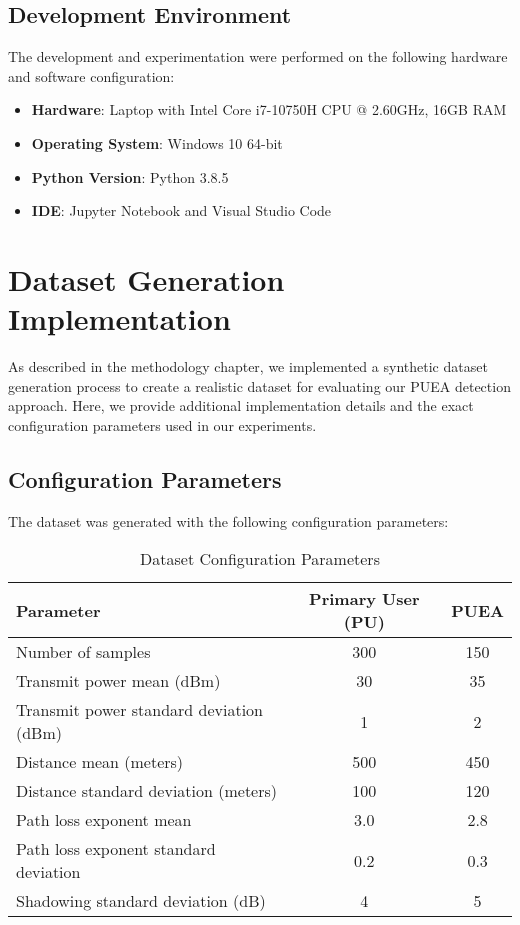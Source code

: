 \subsection{Development Environment}
The development and experimentation were performed on the following hardware and software configuration:
\begin{itemize}
    \item \textbf{Hardware}: Laptop with Intel Core i7-10750H CPU @ 2.60GHz, 16GB RAM
    \item \textbf{Operating System}: Windows 10 64-bit
    \item \textbf{Python Version}: Python 3.8.5
    \item \textbf{IDE}: Jupyter Notebook and Visual Studio Code
\end{itemize}

\section{Dataset Generation Implementation}
As described in the methodology chapter, we implemented a synthetic dataset generation process to create a realistic dataset for evaluating our PUEA detection approach. Here, we provide additional implementation details and the exact configuration parameters used in our experiments.

\subsection{Configuration Parameters}
The dataset was generated with the following configuration parameters:

\begin{table}[h]
    \centering
    \caption{Dataset Configuration Parameters}
    \label{tab:dataset_params}
    \begin{tabular}{lcc}
        \toprule
        Parameter & Primary User (PU) & PUEA \\
        \midrule
        Number of samples & 300 & 150 \\
        Transmit power mean (dBm) & 30 & 35 \\
        Transmit power standard deviation (dBm) & 1 & 2 \\
        Distance mean (meters) & 500 & 450 \\
        Distance standard deviation (meters) & 100 & 120 \\
        Path loss exponent mean & 3.0 & 2.8 \\
        Path loss exponent standard deviation & 0.2 & 0.3 \\
        Shadowing standard deviation (dB) & 4 & 5 \\
        \bottomrule
    \end{tabular}
\end{table}

